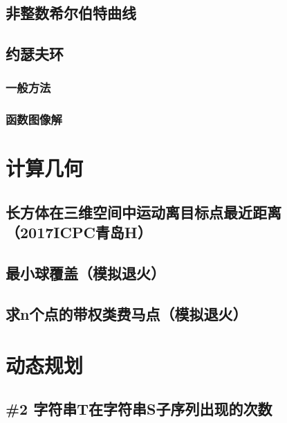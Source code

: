 \documentclass[twoside,a4paper]{article}
\begin{document}
\subsection{非整数希尔伯特曲线}


\subsection{约瑟夫环}
\subsubsection{一般方法}

\subsubsection{函数图像解}


\section{计算几何}

\subsection{长方体在三维空间中运动离目标点最近距离（2017ICPC青岛H）}


\subsection{最小球覆盖（模拟退火）}


\subsection{求n个点的带权类费马点（模拟退火）}


\section{动态规划}

\subsection{\#2 字符串T在字符串S子序列出现的次数}

\end{document}
